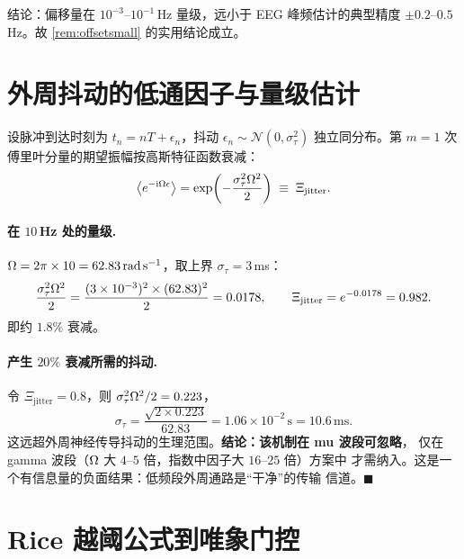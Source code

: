 结论：偏移量在 $10^{-3}$--$10^{-1}\,$Hz 量级，远小于 EEG 峰频估计的典型精度
$\pm0.2$--$0.5\,$Hz。故 \cref{rem:offsetsmall} 的实用结论成立。

\section{外周抖动的低通因子与量级估计}
\label{app:jitter}

设脉冲到达时刻为 $t_{n}=nT+\epsilon_{n}$，抖动
$\epsilon_{n}\sim\mathcal{N}(0,\sigma_{\tau}^{2})$ 独立同分布。第 $m=1$ 次
傅里叶分量的期望振幅按高斯特征函数衰减：
%
\begin{equation}
\bigl\langle e^{-\mathrm{i}\Omega\epsilon}\bigr\rangle
=\exp\!\left(-\frac{\sigma_{\tau}^{2}\Omega^{2}}{2}\right)
\;\equiv\;\Xi_{\mathrm{jitter}} .
\end{equation}

\paragraph{在 $10\,$Hz 处的量级.}
$\Omega=2\pi\times10=62.83\,\mathrm{rad\,s^{-1}}$，取上界
$\sigma_{\tau}=3\,$ms：
%
\begin{equation}
\frac{\sigma_{\tau}^{2}\Omega^{2}}{2}
=\frac{(3\times10^{-3})^{2}\times(62.83)^{2}}{2}=0.0178 ,
\qquad
\Xi_{\mathrm{jitter}}=e^{-0.0178}=0.982 .
\end{equation}
%
即约 $1.8\%$ 衰减。

\paragraph{产生 $20\%$ 衰减所需的抖动.}
令 $\Xi_{\mathrm{jitter}}=0.8$，则 $\sigma_{\tau}^{2}\Omega^{2}/2=0.223$，
%
\begin{equation}
\sigma_{\tau}=\frac{\sqrt{2\times0.223}}{62.83}=1.06\times10^{-2}\,\mathrm{s}
=10.6\,\mathrm{ms} .
\end{equation}
%
这远超外周神经传导抖动的生理范围。\textbf{结论：该机制在 mu 波段可忽略}，
仅在 gamma 波段（$\Omega$ 大 $4$--$5$ 倍，指数中因子大 $16$--$25$ 倍）方案中
才需纳入。这是一个有信息量的负面结果：低频段外周通路是“干净”的传输
信道。\hfill$\blacksquare$

\section{Rice 越阈公式到唯象门控}
\label{app:rice}

